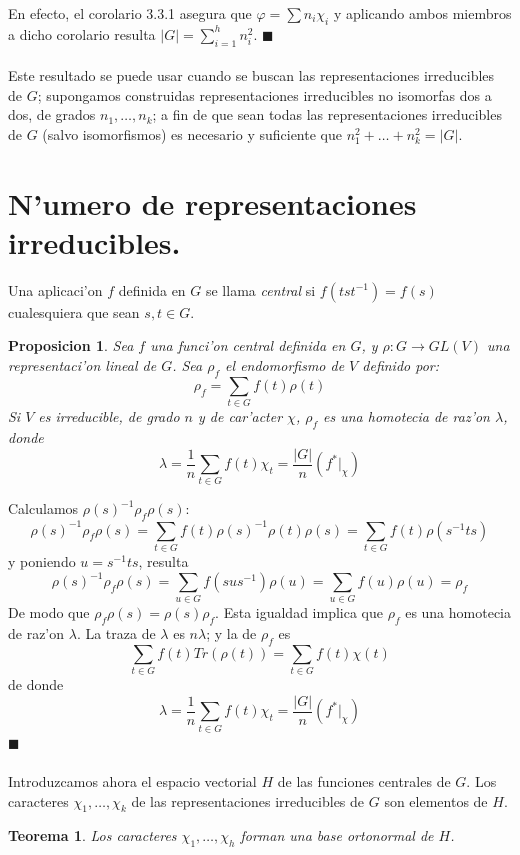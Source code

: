 \documentclass[a4paper,openright,12pt]{book}
\numberwithin{equation}{section} %
\newtheorem{teorema}{Teorema}[section] %
\newtheorem{proposicion}{Proposicion}[section] %
\newenvironment{proof}{\noindent{\it Demostracion:}}{\hfill$\blacksquare$} %
\begin{document}
\begin{proof}
En efecto, el corolario 3.3.1 asegura que $\varphi = \sum n_{i} \chi_{i}$ y aplicando ambos miembros a dicho corolario resulta $|G|=\sum_{i=1}^{h} n_{i}^{2}$. 
\end{proof}\\
\\
Este resultado se puede usar cuando se buscan las representaciones irreducibles de $G$; supongamos construidas representaciones irreducibles no isomorfas dos a dos, de grados $n_{1}, \ldots ,n_{k}$; a fin de que sean todas las representaciones irreducibles de $G$ (salvo isomorfismos) es necesario y suficiente que $n_{1}^{2}+ \ldots + n_{k}^{2}=|G|$.
\section{N'umero de representaciones irreducibles.}
Una aplicaci'on $f$ definida en $G$ se llama \emph{central} si $f(tst^{-1})=f(s)$ cualesquiera que sean $s, t \in G$.
\begin{proposicion}
Sea $f$ una funci'on central definida en $G$, y $\rho: G \rightarrow GL(V)$ una representaci'on lineal de $G$. Sea $\rho_{f}$ el endomorfismo de $V$ definido por:
\[
\rho_{f}=\sum_{t \in G} f(t)\rho (t)
\]
Si $V$ es irreducible, de grado $n$ y de car'acter $\chi$, $\rho_{f}$ es una homotecia de raz'on $\lambda$, donde
\[
\lambda = \frac{1}{n}\sum_{t \in G} f(t)\chi_{t}=\frac{|G|}{n}(f^{*}|_{\chi})
\]
\end{proposicion}
\begin{proof}
Calculamos $\rho (s)^{-1}\rho_{f}\rho (s) $:
\[
\rho (s)^{-1}\rho_{f}\rho (s)=\sum_{t \in G}f(t)\rho(s)^{-1}\rho(t)\rho(s)=\sum_{t \in G}f(t)\rho(s^{-1}ts)
\]
y poniendo $u=s^{-1}ts$, resulta
\[
\rho (s)^{-1}\rho_{f}\rho (s)=\sum_{u \in G}f(sus^{-1})\rho (u)=\sum_{u \in G}f(u)\rho (u)=\rho_{f}
\]
De modo que $\rho_{f}\rho(s)=\rho(s)\rho_{f}$. Esta igualdad implica que $\rho_{f}$ es una homotecia de raz'on $\lambda$. La traza de $\lambda$ es $n \lambda$; y la de $\rho_{f}$ es
\[
\sum_{t \in G}f(t)Tr(\rho (t))=\sum_{t \in G}f(t)\chi (t)
\]
de donde
\[
\lambda = \frac{1}{n}\sum_{t \in G} f(t)\chi_{t}=\frac{|G|}{n}(f^{*}|_{\chi})
\]
\end{proof}\\
\\
Introduzcamos ahora el espacio vectorial $H$ de las funciones centrales de $G$. Los caracteres 
$\chi_{1}, \ldots ,\chi_{k}$ de las representaciones irreducibles de $G$ son elementos de $H$.
\begin{teorema}
Los caracteres $\chi_{1}, \ldots ,\chi_{h}$ forman una base ortonormal de $H$.
\end{teorema}
\end{document}
